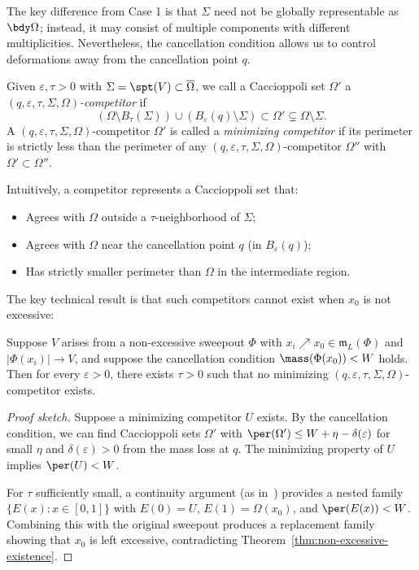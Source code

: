 The key difference from Case 1 is that $\Sigma$ need not be globally representable as $\bdy\Omega$; instead,
it may consist of multiple components with different multiplicities. Nevertheless, the cancellation condition
allows us to control deformations away from the cancellation point $q$.

\begin{definition}\label{def:competitor}
Given $\varepsilon, \tau > 0$ with $\Sigma = \spt(V) \subset \overline{\Omega}$, we call a Caccioppoli set
$\Omega'$ a \emph{$(q, \varepsilon, \tau, \Sigma, \Omega)$-competitor} if
\[
    (\Omega \setminus B_\tau(\Sigma)) \cup (B_\varepsilon(q) \setminus \Sigma) \subset \Omega' \subsetneq \Omega \setminus \Sigma.
\]
A $(q, \varepsilon, \tau, \Sigma, \Omega)$-competitor $\Omega'$ is called a \emph{minimizing competitor}
if its perimeter is strictly less than the perimeter of any $(q, \varepsilon, \tau, \Sigma, \Omega)$-competitor
$\Omega''$ with $\Omega' \subset \Omega''$.
\end{definition}

Intuitively, a competitor represents a Caccioppoli set that:
\begin{itemize}
    \item Agrees with $\Omega$ outside a $\tau$-neighborhood of $\Sigma$;
    \item Agrees with $\Omega$ near the cancellation point $q$ (in $B_\varepsilon(q)$);
    \item Has strictly smaller perimeter than $\Omega$ in the intermediate region.
\end{itemize}

The key technical result is that such competitors cannot exist when $x_0$ is not excessive:

\begin{proposition}\label{prop:no-competitor}
Suppose $V$ arises from a non-excessive sweepout $\Phi$ with $x_i \nearrow x_0 \in \mathfrak{m}_L(\Phi)$
and $|\Phi(x_i)| \to V$, and suppose the cancellation condition $\mass(\Phi(x_0)) < W$ holds. Then for
every $\varepsilon > 0$, there exists $\tau > 0$ such that no minimizing
$(q, \varepsilon, \tau, \Sigma, \Omega)$-competitor exists.
\end{proposition}

\begin{proof}[Proof sketch]
Suppose a minimizing competitor $U$ exists. By the cancellation condition, we can find Caccioppoli sets
$\Omega'$ with $\per(\Omega') \leq W + \eta - \delta(\varepsilon)$ for small $\eta$ and $\delta(\varepsilon) > 0$
from the mass loss at $q$. The minimizing property of $U$ implies $\per(U) < W$.

For $\tau$ sufficiently small, a continuity argument (as in~\cite[Lemma 3.3]{CLS22}) provides a nested
family $\{E(x) : x \in [0,1]\}$ with $E(0) = U$, $E(1) = \Omega(x_0)$, and $\per(E(x)) < W$. Combining
this with the original sweepout produces a replacement family showing that $x_0$ is left excessive,
contradicting Theorem~\ref{thm:non-excessive-existence}.
\end{proof}

